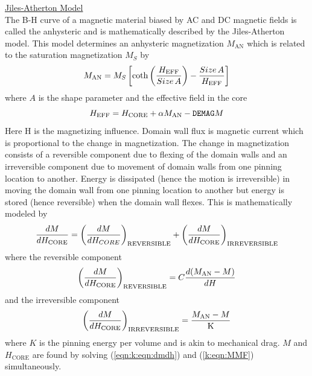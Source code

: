 \documentclass{article}
\begin{document}
\noindent\underline{Jiles-Atherton Model}\\[0.1in]
The B-H curve of a magnetic material biased by AC and DC
magnetic fields is called the anhysteric and is mathematically
described by the Jiles-Atherton model. This model determines an
anhysteric magnetization $M_{\mathrm{AN}}$ which is related to the
saturation magnetization $M_S$ by
\begin{equation}
M_{\mathrm{AN}} = M_S \left[ \mbox{coth}\left(
       {{\textstyle H_{\mathrm{EFF}}} \over {\textstyle Size\,A}}\right)
       - {{\textstyle Size\, A} \over {\textstyle H_{\mathrm{EFF}}}} \right]
\end{equation}
where $A$ is the shape parameter and the effective field in the
core
\begin{equation}
H_{\mathrm{EFF}} = H_{\mathrm{CORE}} + \alpha M_{\mathrm{AN}}
 - {\tt DEMAG} M
\end{equation}
Here H is the magnetizing influence. Domain wall flux is magnetic
current which is proportional to the change in magnetization. The
change in magnetization consists of a reversible component due to
flexing of the domain walls and an irreversible component due to
movement of domain walls from one pinning location to another.
Energy is dissipated (hence the motion is irreversible) in moving
the domain wall from one pinning location to another but energy is
stored (hence reversible) when the domain wall flexes.  This is
mathematically modeled by
\begin{equation}
{{\textstyle d M } \over {{\textstyle d H_{\mathrm{CORE}}}}} =
\left({{\textstyle d M\mathrm{ } \over
 {{\textstyle d H_{CORE}}}}}\right)_{\mathrm{REVERSIBLE}} +
\left({{\textstyle d M } \over
 {{\textstyle d H_{\mathrm{CORE}}}}}\right)_{\mathrm{IRREVERSIBLE}}
\label{eqn:k:eqn:dmdh}
\end{equation}
where the reversible component
\begin{equation}
\left({{\textstyle d M } \over
 {{\textstyle d H_{\mathrm{CORE}}}}}\right)_{\mathrm{REVERSIBLE}}
= C {{\textstyle d( M_{\mathrm{AN}} - M)} \over {{\textstyle d H}}}
\end{equation}
and the irreversible component
\begin{equation}
\left({{\textstyle d M } \over {{\textstyle d
H_{\mathrm{CORE}}}}}\right)_{\mathrm{IRREVERSIBLE}} = {{\textstyle
M_{\mathrm{AN}} - M } \over { \mathrm{K} }}
\end{equation}
where $K$ is the pinning energy per volume and is akin to
mechanical drag. $M$ and $H_{\mathrm{CORE}}$ are found by solving
(\ref{eqn:k:eqn:dmdh}) and (\ref{k:eqn:MMF}) simultaneously.
\end{document}

